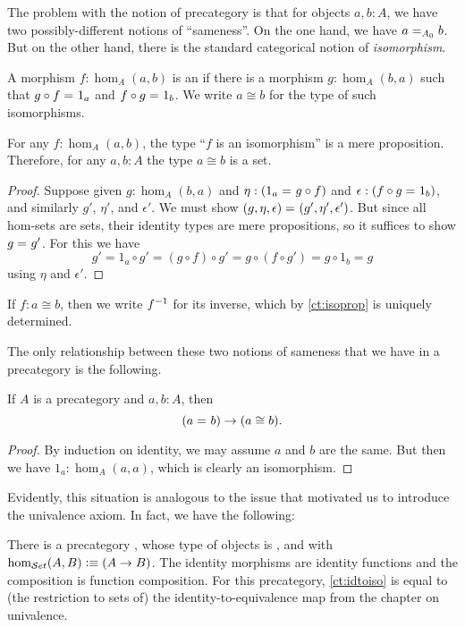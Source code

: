 The problem with the notion of precategory is that for objects $a,b:A$, we have two possibly-different notions of ``sameness''.
On the one hand, we have $\id[A_0]{a}{b}$.
But on the other hand, there is the standard categorical notion of \emph{isomorphism}.

\begin{defn}\label{ct:isomorphism}
  A morphism $f:\hom_A(a,b)$ is an  if there is a morphism $g:\hom_A(b,a)$ such that $\id{g\circ f}{1_a}$ and $\id{f\circ g}{1_b}$.
  We write $a\cong b$ for the type of such isomorphisms.
\end{defn}

\begin{lem}\label{ct:isoprop}
  For any $f:\hom_A(a,b)$, the type ``$f$ is an isomorphism'' is a mere proposition.
  Therefore, for any $a,b:A$ the type $a\cong b$ is a set.
\end{lem}
\begin{proof}
  Suppose given $g:\hom_A(b,a)$ and $\eta:(\id{1_a}{g\circ f})$ and $\epsilon:(\id{f\circ g}{1_b})$, and similarly $g'$, $\eta'$, and $\epsilon'$.
We must show $\id{(g,\eta,\epsilon)}{(g',\eta',\epsilon')}$.
  But since all hom-sets are sets, their identity types are mere propositions, so it suffices to show $\id g {g'}$.
  For this we have
  \[g' = 1_a\circ g' = (g\circ f)\circ g' = g\circ (f\circ g') = g\circ 1_b = g\]
  using $\eta$ and $\epsilon'$.
\end{proof}

If $f:a\cong b$, then we write $\inv f$ for its inverse, which by \autoref{ct:isoprop} is uniquely determined.

The only relationship between these two notions of sameness that we have in a precategory is the following.

\begin{lem}\label{ct:idtoiso}
  If $A$ is a precategory and $a,b:A$, then
  \[(\id a b)\to (a \cong b).\]
\end{lem}
\begin{proof}
  By induction on identity, we may assume $a$ and $b$ are the same.
  But then we have $1_a:\hom_A(a,a)$, which is clearly an isomorphism.
\end{proof}

Evidently, this situation is analogous to the issue that motivated us to introduce the univalence axiom.
In fact, we have the following:

\begin{eg}\label{ct:precatset}
  There is a precategory \uset, whose type of objects is \set, and with $\hom_{\uset}(A,B) \defeq (A\to B)$.
  The identity morphisms are identity functions and the composition is function composition.
  For this precategory, \autoref{ct:idtoiso} is equal to (the restriction to sets of) the identity-to-equivalence map from the chapter on univalence.
\end{eg}

